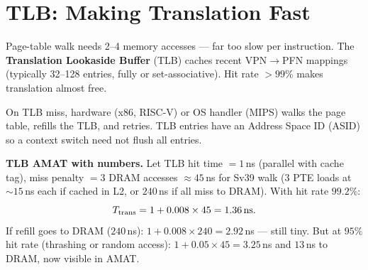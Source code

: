\section{TLB: Making Translation Fast}
Page-table walk needs 2--4 memory accesses --- far too slow per instruction. The \textbf{Translation Lookaside Buffer} (TLB) caches recent VPN$\to$PFN mappings (typically 32--128 entries, fully or set-associative). Hit rate $>99\%$ makes translation almost free.
\begin{center}
\end{center}

On TLB miss, hardware (x86, RISC-V) or OS handler (MIPS) walks the page table, refills the TLB, and retries. TLB entries have an Address Space ID (ASID) so a context switch need not flush all entries.

\textbf{TLB AMAT with numbers.} Let TLB hit time $=1$\,ns (parallel with cache tag), miss penalty $=3$ DRAM accesses $\approx 45$\,ns for Sv39 walk (3 PTE loads at $\sim 15$\,ns each if cached in L2, or $240$\,ns if all miss to DRAM). With hit rate $99.2\%$:
\[ T_{\text{trans}} = 1 + 0.008 \times 45 = 1.36\text{\,ns}. \]
If refill goes to DRAM ($240$\,ns): $1 + 0.008\times240 = 2.92$\,ns --- still tiny. But at $95\%$ hit rate (thrashing or random access): $1+0.05\times45=3.25$\,ns and $13$\,ns to DRAM, now visible in AMAT.

